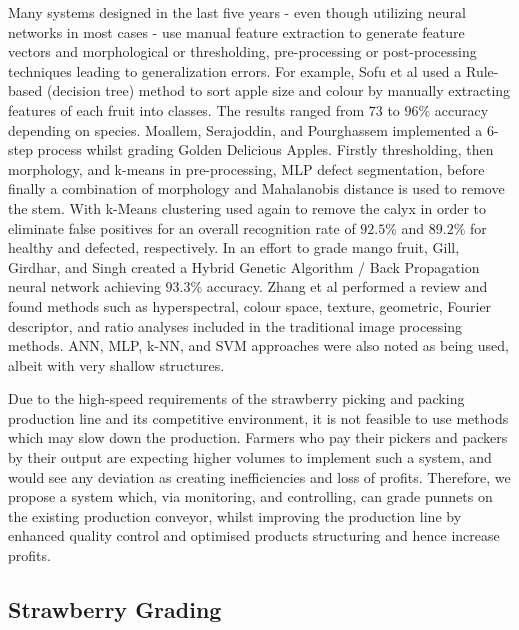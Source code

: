 \documentclass[conference]{IEEEtran}
\begin{document}
Many systems designed in the last five years - even though utilizing neural networks in most cases - use manual feature extraction to generate feature vectors and morphological or thresholding, pre-processing or post-processing techniques leading to generalization errors. For example, Sofu et al \cite{sofu} used a Rule-based (decision tree) method to sort apple size and colour by manually extracting features of each fruit into classes. The results ranged from $73$ to $96\%$ accuracy depending on species. Moallem, Serajoddin, and Pourghassem \cite{moallum} implemented a 6-step process whilst grading Golden Delicious Apples. Firstly thresholding, then morphology, and k-means in pre-processing, MLP defect segmentation, before finally a combination of morphology and Mahalanobis distance is used to remove the stem. With k-Means clustering used again to remove the calyx in order to eliminate false positives for an overall recognition rate of $92.5\%$ and $89.2\%$ for healthy and defected, respectively.
In an effort to grade mango fruit, Gill, Girdhar, and Singh \cite{gill} created a Hybrid Genetic Algorithm / Back Propagation neural network achieving $93.3\%$ accuracy. Zhang et al \cite{zhang} performed a review and found methods such as hyperspectral, colour space, texture, geometric, Fourier descriptor, and ratio analyses included in the traditional image processing methods. ANN, MLP, k-NN, and SVM approaches were also noted as being used, albeit with very shallow structures.

Due to the high-speed requirements of the strawberry picking and packing production line and its competitive environment, it is not feasible to use methods which may slow down the production. Farmers who pay their pickers and packers by their output are expecting higher volumes to implement such a system, and would see any deviation as creating inefficiencies and loss of profits. Therefore, we propose a system which, via monitoring, and controlling, can grade punnets on the existing production conveyor, whilst improving the production line by enhanced quality control and optimised products structuring and hence increase profits. 


\subsection{Strawberry Grading}
\end{document}
